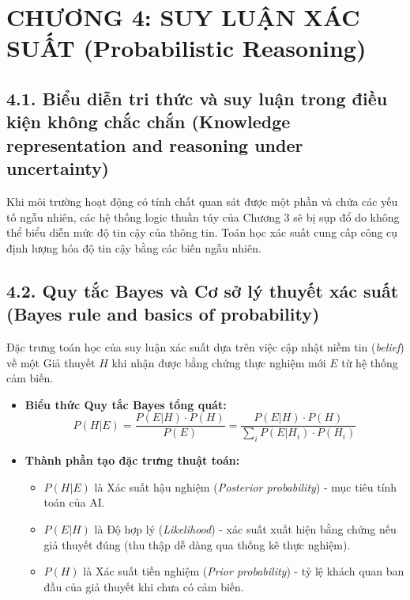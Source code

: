 \documentclass[../main.tex]{subfiles}
\begin{document}

\section{CHƯƠNG 4: SUY LUẬN XÁC SUẤT (Probabilistic Reasoning)}

\subsection{4.1. Biểu diễn tri thức và suy luận trong điều kiện không chắc chắn (Knowledge representation and reasoning under uncertainty)}
Khi môi trường hoạt động có tính chất quan sát được một phần và chứa các yếu tố ngẫu nhiên, các hệ thống logic thuần túy của Chương 3 sẽ bị sụp đổ do không thể biểu diễn mức độ tin cậy của thông tin. Toán học xác suất cung cấp công cụ định lượng hóa độ tin cậy bằng các biến ngẫu nhiên.

\subsection{4.2. Quy tắc Bayes và Cơ sở lý thuyết xác suất (Bayes rule and basics of probability)}
Đặc trưng toán học của suy luận xác suất dựa trên việc cập nhật niềm tin (\textit{belief}) về một Giả thuyết $H$ khi nhận được bằng chứng thực nghiệm mới $E$ từ hệ thống cảm biến.
\begin{itemize}
    \item \textbf{Biểu thức Quy tắc Bayes tổng quát:}
    \begin{equation}
        P(H | E) = \frac{P(E | H) \cdot P(H)}{P(E)} = \frac{P(E | H) \cdot P(H)}{\sum_{i} P(E | H_i) \cdot P(H_i)}
    \end{equation}
    \item \textbf{Thành phần tạo đặc trưng thuật toán:}
    \begin{itemize}
        \item $P(H | E)$ là Xác suất hậu nghiệm (\textit{Posterior probability}) - mục tiêu tính toán của AI.
        \item $P(E | H)$ là Độ hợp lý (\textit{Likelihood}) - xác suất xuất hiện bằng chứng nếu giả thuyết đúng (thu thập dễ dàng qua thống kê thực nghiệm).
        \item $P(H)$ là Xác suất tiền nghiệm (\textit{Prior probability}) - tỷ lệ khách quan ban đầu của giả thuyết khi chưa có cảm biến.
    \end{itemize}
\end{itemize}
\end{document}
